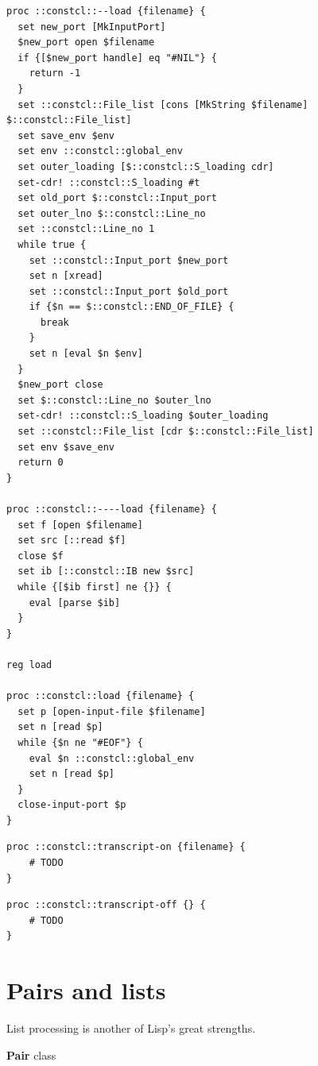 \documentclass[twoside,9pt]{report}
\begin{document}
\noindent\makebox[\linewidth]{\rule{\linewidth}{0.4pt}}
\begin{lstlisting}
proc ::constcl::--load {filename} {
  set new_port [MkInputPort]
  $new_port open $filename
  if {[$new_port handle] eq "#NIL"} {
    return -1
  }
  set ::constcl::File_list [cons [MkString $filename] $::constcl::File_list]
  set save_env $env
  set env ::constcl::global_env
  set outer_loading [$::constcl::S_loading cdr]
  set-cdr! ::constcl::S_loading #t
  set old_port $::constcl::Input_port
  set outer_lno $::constcl::Line_no
  set ::constcl::Line_no 1
  while true {
    set ::constcl::Input_port $new_port
    set n [xread]
    set ::constcl::Input_port $old_port
    if {$n == $::constcl::END_OF_FILE} {
      break
    }
    set n [eval $n $env]
  }
  $new_port close
  set $::constcl::Line_no $outer_lno
  set-cdr! ::constcl::S_loading $outer_loading
  set ::constcl::File_list [cdr $::constcl::File_list]
  set env $save_env
  return 0
}
 
proc ::constcl::----load {filename} {
  set f [open $filename]
  set src [::read $f]
  close $f
  set ib [::constcl::IB new $src]
  while {[$ib first] ne {}} {
    eval [parse $ib]
  }
}
 
reg load
 
proc ::constcl::load {filename} {
  set p [open-input-file $filename]
  set n [read $p]
  while {$n ne "#EOF"} {
    eval $n ::constcl::global_env
    set n [read $p]
  }
  close-input-port $p
}
\end{lstlisting}
\noindent\makebox[\linewidth]{\rule{\linewidth}{0.4pt}}
\noindent\makebox[\linewidth]{\rule{\linewidth}{0.4pt}}
\begin{lstlisting}
proc ::constcl::transcript-on {filename} {
    # TODO
}
\end{lstlisting}
\noindent\makebox[\linewidth]{\rule{\linewidth}{0.4pt}}
\noindent\makebox[\linewidth]{\rule{\linewidth}{0.4pt}}
\begin{lstlisting}
proc ::constcl::transcript-off {} {
    # TODO
}
\end{lstlisting}
\noindent\makebox[\linewidth]{\rule{\linewidth}{0.4pt}}
\section{Pairs and lists}
\label{pairs-and-lists}

List processing is another of Lisp's great strengths.


\textbf{Pair} class
\end{document}
